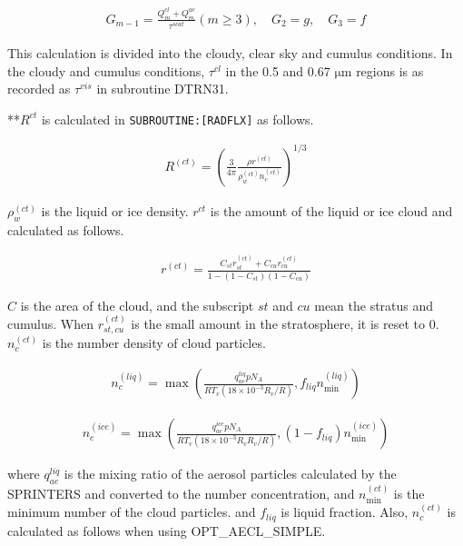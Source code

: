 \begin{eqnarray}
G_{m-1}=\frac{Q_{m}^{c l}+Q_{m}^{ae}}{\tau^{s c a t}}(m \geq 3), \quad G_{2}=g, \quad G_{3}=f
\end{eqnarray}

This calculation is divided into the cloudy, clear sky and cumulus
conditions. In the cloudy and cumulus conditions, \(\tau^{cl}\) in the
0.5 and 0.67 \(\mathrm{{\mu}m}\) regions is as recorded as
\(\tau^{vis}\) in subroutine DTRN31.

**\(R^{ct}\) is calculated in \texttt{SUBROUTINE:{[}RADFLX{]}} as
follows.

\begin{eqnarray}
R^{(c t)}=\left(\frac{3}{4 \pi} \frac{\rho r^{(c t)}}{\rho_{w}^{(c t)} n_{c}^{(c t)}}\right)^{1 / 3}
\end{eqnarray}

\(\rho_{w}^{(c t)}\) is the liquid or ice density. \(r^{ct}\) is the
amount of the liquid or ice cloud and calculated as follows.

\begin{eqnarray}
r^{(c t)}=\frac{C_{s t} r_{s t}^{(c t)}+C_{c u} r_{c u}^{(c t)}}{1-\left(1-C_{s t}\right)\left(1-C_{c u}\right)}
\end{eqnarray}

\(C\) is the area of the cloud, and the subscript \(st\) and \(cu\) mean
the stratus and cumulus. When \(r_{s t, c u}^{(c t)}\) is the small
amount in the stratosphere, it is reset to 0. \(n_{c}^{(c t)}\) is the
number density of cloud particles.

\begin{eqnarray}
n_{c}^{(l i q)}=\max \left(\frac{q_{a e}^{l i q} p N_{A}}{R T_{v}\left(18 \times 10^{-3} R_{v} / R\right)}, f_{l i q} n_{\min }^{(l i q)}\right)
\end{eqnarray}

\begin{eqnarray}
n_{c}^{(i c e)}=\max \left(\frac{q_{a e}^{i c e} p N_{A}}{R T_{v}\left(18 \times 10^{-3} R_{v} R_{v} / R\right)},\left(1-f_{l i q}\right) n_{\min }^{(i c e)}\right)
\end{eqnarray}

where \(q_{a e}^{l i q}\) is the mixing ratio of the aerosol particles
calculated by the SPRINTERS and converted to the number concentration,
and \(n_{\min }^{(c t)}\) is the minimum number of the cloud particles.
and \(f_{liq}\) is liquid fraction. Also, \(n_{c}^{(c t)}\) is
calculated as follows when using OPT\_AECL\_SIMPLE.

